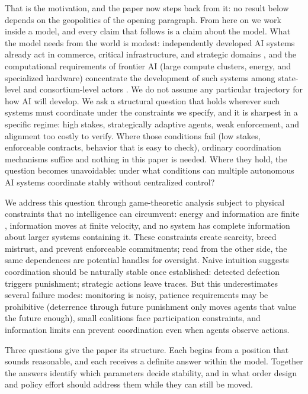 \documentclass[manuscript,screen,review]{jair}
\begin{document}
That is the motivation, and the paper now steps back from it: no result below depends on the geopolitics of the opening paragraph. From here on we work inside a model, and every claim that follows is a claim about the model. What the model needs from the world is modest: independently developed AI systems already act in commerce, critical infrastructure, and strategic domains \cite{bostrom.2014,dafoe.2018,hendrycks.2024}, and the computational requirements of frontier AI (large compute clusters, energy, and specialized hardware) concentrate the development of such systems among state-level and consortium-level actors \cite{hammond.2025,tomasev.2025,stastny.2021}. We do not assume any particular trajectory for how AI will develop. We ask a structural question that holds wherever such systems must coordinate under the constraints we specify, and it is sharpest in a specific regime: high stakes, strategically adaptive agents, weak enforcement, and alignment too costly to verify. Where those conditions fail (low stakes, enforceable contracts, behavior that is easy to check), ordinary coordination mechanisms suffice and nothing in this paper is needed. Where they hold, the question becomes unavoidable: under what conditions can multiple autonomous AI systems coordinate stably without centralized control?

We address this question through game-theoretic analysis subject to physical constraints that no intelligence can circumvent: energy and information are finite \cite{shannon.1948,landauer.1961}, information moves at finite velocity, and no system has complete information about larger systems containing it. These constraints create scarcity, breed mistrust, and prevent enforceable commitments; read from the other side, the same dependences are potential handles for oversight. Naive intuition suggests coordination should be naturally stable once established: detected defection triggers punishment; strategic actions leave traces. But this underestimates several failure modes: monitoring is noisy, patience requirements may be prohibitive (deterrence through future punishment only moves agents that value the future enough), small coalitions face participation constraints, and information limits can prevent coordination even when agents observe actions.

Three questions give the paper its structure. Each begins from a position that sounds reasonable, and each receives a definite answer within the model. Together the answers identify which parameters decide stability, and in what order design and policy effort should address them while they can still be moved.
\end{document}
